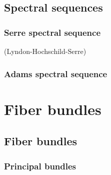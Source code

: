 \documentclass{../../large}
\begin{document}
\chapter{Spectral sequences}
\section{Serre spectral sequence}
	(Lyndon-Hochschild-Serre)
\section{Adams spectral sequence}











\part{Fiber bundles}




\chapter{Fiber bundles}


\section{Principal bundles}
\end{document}
